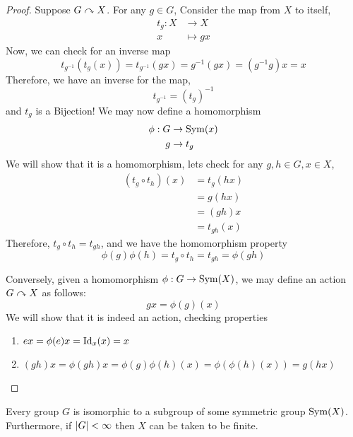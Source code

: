 \documentclass{article}
\begin{document}
\begin{proof}
    Suppose $G \curvearrowright X$. For any $g \in G$, Consider the map from $X$ to itself,
    \begin{align*}
        t_g : X &\rightarrow X \\
        x &\mapsto gx
    \end{align*}
    Now, we can check for an inverse map
    \[
        t_{g^{-1}}(t_g(x)) = t_{g^{-1}}(gx) = g^{-1}(gx) = (g^{-1}g)x = x
    \]
    Therefore, we have an inverse for the map,
    \[
        t_{g^{-1}} = (t_g)^{-1}
    \]
    and $t_g$ is a Bijection! We may now define a homomorphism
    \begin{align*}
        \phi : G &\rightarrow \operatorname{Sym}(x) \\
        g &\rightarrow t_g
    \end{align*}
    We will show that it is a homomorphism, lets check for any $g, h \in G, x \in X$,
    \begin{align*}
        (t_g \circ t_h)(x) &= t_g(hx) \\
        &= g(hx) \\
        &= (gh)x \\
        &= t_{gh}(x)
    \end{align*}
    Therefore, $t_g \circ t_h = t_{gh}$, and we have the homomorphism property
    \[
        \phi(g)\phi(h) = t_g \circ t_h = t_{gh} = \phi(gh)  
    \]

    Conversely, given a homomorphism $\phi: G \rightarrow \operatorname{Sym}(X)$, we may define an action $G \curvearrowright X$ as follows:
    \[
        gx = \phi(g)(x)  
    \]
    We will show that it is indeed an action, checking properties
    \begin{enumerate}
        \item $ex = \phi(e)x = \mathrm{Id}_x(x) = x$
        \item $(gh)x = \phi(gh)x = \phi(g)\phi(h)(x) = \phi(\phi(h)(x)) = g(hx)$
    \end{enumerate}
\end{proof}

\begin{thm}
    Every group $G$ is isomorphic to a subgroup of some symmetric group $\operatorname{Sym}(X)$. Furthermore, if $\left\lvert G\right\rvert < \infty$ then $X$ can be taken to be finite.
\end{thm}
\end{document}
